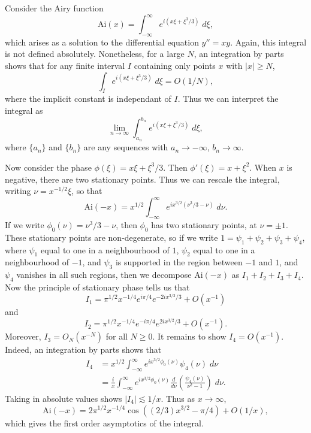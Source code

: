 \begin{example}
  Consider the Airy function
  \[ \text{Ai}(x) = \int_{-\infty}^\infty e^{i(x \xi + \xi^3/3)}\; d\xi, \]
  which arises as a solution to the differential equation $y'' = xy$. Again, this integral is not defined absolutely. Nonetheless, for a large $N$, an integration by parts shows that for any finite interval $I$ containing only points $x$ with $|x| \geq N$,
  \[ \int_I e^{i(x \xi + \xi^3/3)}\; d\xi = O(1/N), \]
  where the implicit constant is independant of $I$. Thus we can interpret the integral as
  \[ \lim_{n \to \infty} \int_{a_n}^{b_n} e^{i(x \xi + \xi^3/3)}\; d\xi, \]
  where $\{ a_n \}$ and $\{ b_n \}$ are any sequences with $a_n \to -\infty$, $b_n \to \infty$.

  Now consider the phase $\phi(\xi) = x \xi + \xi^3/3$. Then $\phi'(\xi) = x + \xi^2$. When $x$ is negative, there are two stationary points. Thus we can rescale the integral, writing $\nu = x^{-1/2} \xi$, so that
  \[ \text{Ai}(-x) = x^{1/2} \int_{-\infty}^\infty e^{i x^{3/2}(\nu^3/3 - \nu)}\; d\nu. \]
  If we write $\phi_0(\nu) = \nu^3/3 - \nu$, then $\phi_0$ has two stationary points, at $\nu = \pm 1$. These stationary points are non-degenerate, so if we write $1 = \psi_1 + \psi_2 + \psi_3 + \psi_4$, where $\psi_1$ equal to one in a neighbourhood of $1$, $\psi_2$ equal to one in a neighbourhood of $-1$, and $\psi_3$ is supported in the region between $-1$ and $1$, and $\psi_4$ vanishes in all such regions, then we decompose $\text{Ai}(-x)$ as $I_1 + I_2 + I_3 + I_4$. Now the principle of stationary phase tells us that
  \[ I_1 = \pi^{1/2} x^{-1/4} e^{i \pi/4} e^{-2i x^{3/2}/3} + O(x^{-1}) \]
  and
  \[ I_2 = \pi^{1/2} x^{-1/4} e^{-i\pi/4} e^{2i x^{3/2}/3} + O(x^{-1}). \]
  Moreover, $I_3 = O_N(x^{-N})$ for all $N \geq 0$. It remains to show $I_4 = O(x^{-1})$. Indeed, an integration by parts shows that
  \begin{align*}
    I_4 &= x^{1/2} \int_{-\infty}^\infty e^{i x^{3/2} \phi_0(\nu)} \psi_4(\nu)\; d\nu\\
    &= \frac{i}{x} \int_{-\infty}^\infty e^{i x^{3/2} \phi_0(\nu)} \frac{d}{d\nu} \left( \frac{\psi_4(\nu)}{\nu^2 - 1} \right)\; d\nu.
  \end{align*}
  Taking in absolute values shows $|I_4| \lesssim 1/x$. Thus as $x \to \infty$,
  \[ \text{Ai}(-x) = 2 \pi^{1/2} x^{-1/4} \cos((2/3) x^{3/2} - \pi/4) + O(1/x), \]
  which gives the first order asymptotics of the integral.


\end{example}
